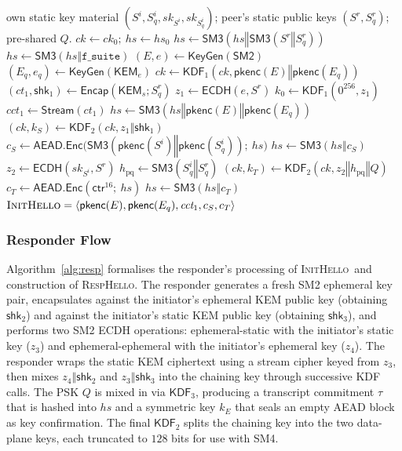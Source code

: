 \documentclass{SCIS2026}
\newcommand{\initmsg}{\textsc{InitHello}\xspace}
\newcommand{\respmsg}{\textsc{RespHello}\xspace}
\newcommand{\concat}{\mathbin{\Vert}}
\newcommand{\KDF}{\mathsf{KDF}}
\newcommand{\AEAD}{\mathsf{AEAD}}
\newcommand{\KEMs}{\textsf{KEM}_s}
\newcommand{\KEMe}{\textsf{KEM}_e}
\newcommand{\ECDH}{\mathsf{ECDH}}
\newcommand{\Encap}{\mathsf{Encap}}
\newcommand{\KeyGen}{\mathsf{KeyGen}}
\newcommand{\pkenc}{\mathsf{pkenc}}
\begin{document}
\begin{algorithm}[htbp]
\caption{\initmsg\ construction (initiator $i$).}
\label{alg:init}
\begin{algorithmic}[1]
\REQUIRE own static key material $(S^i, S^i_q, \mathit{sk}_{S^i}, \mathit{sk}_{S^i_q})$;
peer's static public keys $(S^r, S^r_q)$; pre-shared $Q$.
\STATE $ck \gets ck_0;\ hs \gets hs_0$
\STATE $hs \gets \textsf{SM3}(hs \concat \textsf{SM3}(S^r \concat S^r_q))$
\STATE $hs \gets \textsf{SM3}(hs \concat \texttt{f\_suite})$
\STATE $(E, e) \gets \KeyGen(\textsf{SM2})$
\STATE $(E_q, e_q) \gets \KeyGen(\KEMe)$
\STATE $ck \gets \KDF_1(ck, \pkenc(E) \concat \pkenc(E_q))$
\STATE $(\textit{ct}_1, \textsf{shk}_1) \gets \Encap(\KEMs; S^r_q)$
\STATE $z_1 \gets \ECDH(e, S^r)$
\STATE $k_0 \gets \KDF_1(0^{256}, z_1)$
\STATE $\textit{cct}_1 \gets \mathsf{Stream}(\textit{ct}_1)$
\STATE $hs \gets \textsf{SM3}(hs \concat \pkenc(E) \concat \pkenc(E_q))$
\STATE $(ck, k_S) \gets \KDF_2(ck, z_1 \concat \textsf{shk}_1)$
\STATE $c_S \gets \AEAD.\mathsf{Enc}
        \bigl(\textsf{SM3}(\pkenc(S^i) \concat \pkenc(S^i_q));\ hs\bigr)$
\STATE $hs \gets \textsf{SM3}(hs \concat c_S)$
\STATE $z_2 \gets \ECDH(\mathit{sk}_{S^i}, S^r)$
\STATE $h_{\text{pq}} \gets \textsf{SM3}(S^i_q \concat S^r_q)$
\STATE $(ck, k_T) \gets \KDF_2(ck, z_2 \concat h_{\text{pq}} \concat Q)$
\STATE $c_T \gets \AEAD.\mathsf{Enc}(\mathsf{ctr}^{16};\ hs)$
\STATE $hs \gets \textsf{SM3}(hs \concat c_T)$
\STATE \RETURN $\initmsg = \langle \pkenc(E), \pkenc(E_q),
       \textit{cct}_1, c_S, c_T\rangle$
\end{algorithmic}
\end{algorithm}

\subsubsection{Responder Flow}

Algorithm~\ref{alg:resp} formalises the responder's processing of
\initmsg\ and construction of \respmsg.  The responder generates a
fresh SM2 ephemeral key pair, encapsulates against the initiator's
ephemeral KEM public key (obtaining $\textsf{shk}_2$) and against
the initiator's static KEM public key (obtaining $\textsf{shk}_3$),
and performs two SM2 ECDH operations: ephemeral-static with the
initiator's static key ($z_3$) and ephemeral-ephemeral with the
initiator's ephemeral key ($z_4$).  The responder wraps the static
KEM ciphertext using a stream cipher keyed from $z_3$, then mixes
$z_4 \concat \textsf{shk}_2$ and $z_3 \concat \textsf{shk}_3$ into
the chaining key through successive KDF calls.  The PSK $Q$ is mixed
in via $\KDF_3$, producing a transcript commitment $\tau$ that is
hashed into $hs$ and a symmetric key $k_E$ that seals an empty AEAD
block as key confirmation.  The final $\KDF_2$ splits the chaining
key into the two data-plane keys, each truncated to $128$ bits for
use with SM4.
\end{document}
